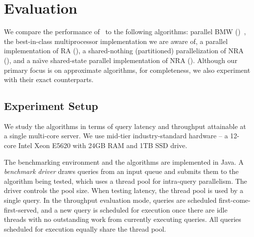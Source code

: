 \section{Evaluation} \label{sec:eval}

We compare the performance of \alg\ to the following algorithms: parallel BMW (\pBMW)~\cite{rojas2013efficient}, 
the best-in-class multiprocessor implementation we are aware of, a parallel implementation of RA (\pRA),  a shared-nothing (partitioned) parallelization of NRA (\sNRA), and a
na\"{\i}ve shared-state parallel implementation of NRA (\pNRA). 
Although our primary focus is on  approximate 
algorithms, for completeness, we also experiment with their exact counterparts.
%



\subsection{Experiment Setup}
\label{ssec:setup}

We study the algorithms in terms of query latency and throughput attainable at a single multi-core server. 
We use mid-tier industry-standard hardware -- a 12-core Intel Xeon E5620 with 24GB RAM and 1TB SSD drive. 


The benchmarking environment and the algorithms  are implemented in Java. 
A  \emph{benchmark driver} draws queries from an input queue and submits them to the algorithm being tested, which
uses a thread pool for intra-query parallelism. 
The driver controls the pool size. %
When testing latency, the thread pool is used by a single query. 
In the throughput evaluation mode, queries are scheduled first-come-first-served, 
and a new query is scheduled for execution 
once  there are idle threads with no outstanding work from currently executing queries.
All queries scheduled for execution equally share the thread pool.

